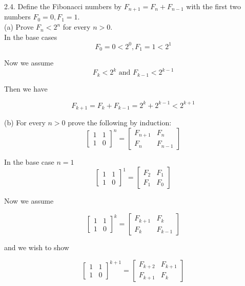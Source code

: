 \documentclass[16 pt]{amsart}
\theoremstyle{definition}
\theoremstyle{remark}
\numberwithin{equation}{subsection}
\begin{document}
2.4.  Define the Fibonacci numbers by $F_{n+1} = F_n + F_{n-1}$ with the first two numbers $F_0 = 0, F_1=1$.\\

(a) Prove $F_n < 2^n$ for every $n>0$.\\


In the base cases
\[
F_0 = 0< 2^0, F_1 = 1 < 2^1
\]


Now we assume
\[
F_k<2^k \text{ and } F_{k-1}< 2^{k-1}
\]

Then we have

\[
F_{k+1} = F_k + F_{k-1} = 2^k + 2^{k-1} < 2^{k+1}
\]


(b) For every $n>0$ prove the following by induction:
\[
\begin{bmatrix}
1 & 1 \\
1 & 0
\end{bmatrix}^n = \begin{bmatrix}
F_{n+1} & F_n\\
F_n & F_{n-1}
\end{bmatrix}
\]


In the base case $n=1$
\[
\begin{bmatrix}
1 & 1\\
1 & 0
\end{bmatrix}^1 = \begin{bmatrix}
F_2 & F_1 \\
F_1 & F_0
\end{bmatrix}
\]


Now we assume

\[
\begin{bmatrix}
1 & 1 \\
1 & 0
\end{bmatrix}^k = \begin{bmatrix}
F_{k+1} & F_k\\
F_k & F_{k-1}
\end{bmatrix}
\]


and we wish to show

\[
\begin{bmatrix}
1 & 1 \\
1 & 0
\end{bmatrix}^{k+1} = \begin{bmatrix}
F_{k+2} & F_{k+1}\\
F_{k+1} & F_{k}
\end{bmatrix}
\]
\end{document}
